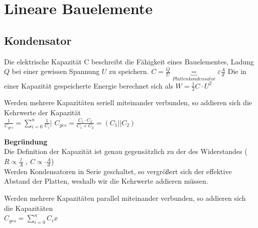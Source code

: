 %
%
%
%
%
\newpage
\section{Lineare Bauelemente}


\subsection{Kondensator}
\beginip
	Die elektrische Kapazität C beschreibt die Fähigkeit eines Bauelementes, Ladung $Q$ bei einer gewissen Spannung $U$ zu speichern.
	\formulaBegin
	$C =\displaystyle \frac{Q}{U} \underbrace{=}_{Plattenkondensator} \varepsilon \frac{A}{d}$
	\formulaEnd
	Die in einer Kapazität gespeicherte Energie berechnet sich als
	\formulaBegin
	$W =\displaystyle \frac{1}{2}C \cdot U^2$
	\formulaEnd
\iend



\beginip
Werden mehrere Kapazitäten seriell miteinander verbunden, so addieren sich die Kehrwerte der Kapazität \\
\formulaBegin
$\displaystyle \frac{1}{C_{ges}} = \sum_{i=0}^n \frac{1}{C_i} \Bigg\rvert$
$\displaystyle C_{ges} = \frac{C_1 \cdot C_2}{C_1 + C_2} = (C_1 || C_2)$
\formulaEnd
\iend


\textbf{Begründung} \\
 	Die Definition der Kapazität ist genau gegensätzlich zu der des Widerstandes ($ R \propto \frac{l}{A}$ , $ C \propto \cdot \frac{A}{d} $)\\
	 Werden Kondensatoren in Serie geschaltet, so vergrößert sich der effektive Abstand der Platten, weshalb wir die Kehrwerte addieren müssen. \\




	\beginip
	Werden mehrere Kapazitäten parallel miteinander verbunden, so addieren sich die Kapazitäten \\
	\formulaBegin
	$\displaystyle C_{ges} = \sum_{i=0}^n C_i x$
	\formulaEnd
	\iend

